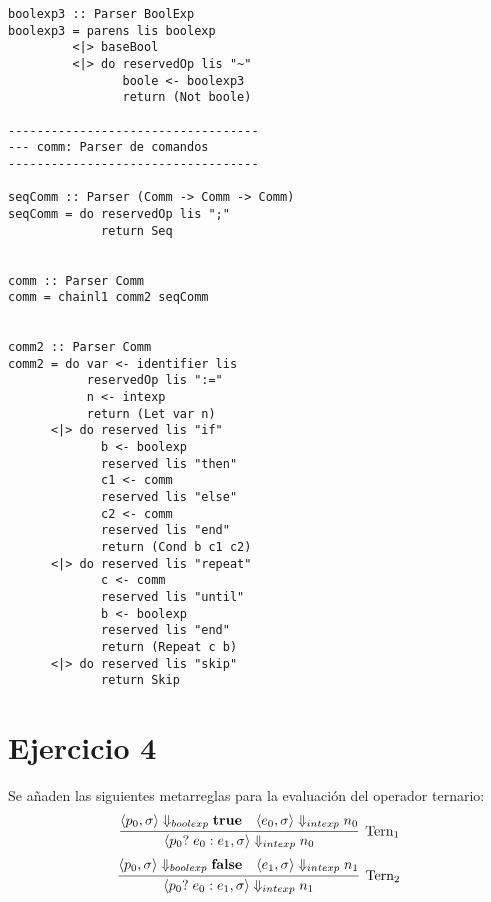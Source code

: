 \documentclass[12pt,a4paper]{article}
\begin{document}
\newpage
\begin{verbatim}
boolexp3 :: Parser BoolExp
boolexp3 = parens lis boolexp
         <|> baseBool
         <|> do reservedOp lis "~"
                boole <- boolexp3
                return (Not boole)

-----------------------------------
--- comm: Parser de comandos
-----------------------------------

seqComm :: Parser (Comm -> Comm -> Comm)
seqComm = do reservedOp lis ";"
             return Seq


comm :: Parser Comm
comm = chainl1 comm2 seqComm


comm2 :: Parser Comm
comm2 = do var <- identifier lis
           reservedOp lis ":="
           n <- intexp
           return (Let var n)
      <|> do reserved lis "if"
             b <- boolexp
             reserved lis "then"
             c1 <- comm
             reserved lis "else"
             c2 <- comm
             reserved lis "end"
             return (Cond b c1 c2)
      <|> do reserved lis "repeat"
             c <- comm
             reserved lis "until"
             b <- boolexp
             reserved lis "end"
             return (Repeat c b)
      <|> do reserved lis "skip"
             return Skip

\end{verbatim}


\section*{Ejercicio 4}
Se a\~naden las siguientes metarreglas para la evaluaci\'on del
operador ternario:
$$ \infer[\mathrm{Tern_{1}}]
         {\langle p_{0} ?\; e_{0}:e_{1}, \sigma \rangle \Downarrow_{intexp} n_{0}}
         {\langle p_{0}, \sigma \rangle \Downarrow_{boolexp} \textbf{true} &
          \langle e_{0}, \sigma \rangle \Downarrow_{intexp} n_{0}} $$
$$ \infer[\mathrm{Tern_{2}}]
         {\langle p_{0} ?\; e_{0}:e_{1}, \sigma \rangle \Downarrow_{intexp} n_{1}}
         {\langle p_{0}, \sigma \rangle \Downarrow_{boolexp} \textbf{false} &
          \langle e_{1}, \sigma \rangle \Downarrow_{intexp} n_{1}} $$
\end{document}

